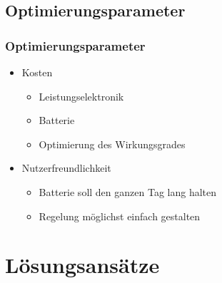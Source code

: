 \documentclass{beamer}
\begin{document}
	\subsection{Optimierungsparameter}
	\begin{frame}
		\frametitle{Optimierungsparameter}
		\begin{itemize}
			\item{Kosten}
			\begin{itemize}
				\item{Leistungselektronik}
				\item{Batterie}
				\item{Optimierung des Wirkungsgrades}
			\end{itemize}
			\item{Nutzerfreundlichkeit}
			\begin{itemize}
				\item{Batterie soll den ganzen Tag lang halten}
				\item{Regelung möglichst einfach gestalten}
			\end{itemize}
		\end{itemize}
	\end{frame}
	\section{Lösungsansätze}
\end{document}

